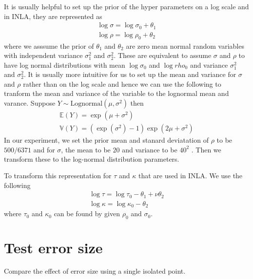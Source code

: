 \documentclass[a4paper,12pt]{article}
\begin{document}
It is usually helpful to set up the prior of the hyper parameters on a log scale and in INLA, they are represented as  
\begin{align}
\log \sigma = \log \sigma_0 + \theta_1 \\
\log \rho = \log \rho_0 + \theta_2
\end{align}
where we asssume the prior of $\theta_1$ and $\theta_2$ are zero mean normal random variables with independent variance $\sigma_1^2$ and $\sigma_2^2$. These are equivalent to assume $\sigma$ and $\rho$ to have log normal distributions with mean $\log \sigma_0$ and $\log rho_0$ and variance  $\sigma_1^2$ and $\sigma_2^2$. It is usually more intuitive for us to set up the mean and variance for $\sigma$ and $\rho$ rather than on the log scale and hence we can use the following to tranform the mean and variance of the variable to the lognormal mean and varance.  Suppose $Y \sim \mbox{Lognormal}(\mu, \sigma^2)$ then
\begin{align}
\mathbb{E}(Y) = \exp(\mu + \sigma^2) \\
\mathbb{V}(Y) = (\exp(\sigma^2)-1)\exp(2\mu + \sigma^2)
\end{align}
In our experiment, we set the prior mean and stanard deviatation of $\rho$ to be $500/6371$ and for $\sigma$, the mean to be $20$ and variance to be $40^2$ . Then we transform these to the log-normal distribution parameters.

To transform this representation for $\tau$ and $\kappa$ that are used in INLA. We use the following
\begin{align}
\log \tau = \log \tau_0 - \theta_1 + \nu \theta_2 \\
\log \kappa = \log \kappa_0 - \theta_2
\end{align}
where $\tau_0$ and $\kappa_0$ can be found by given $\rho_0$ and $\sigma_0$.

\section{Test error size}
Compare the effect of error size using a single isolated point.
 
\end{document}
